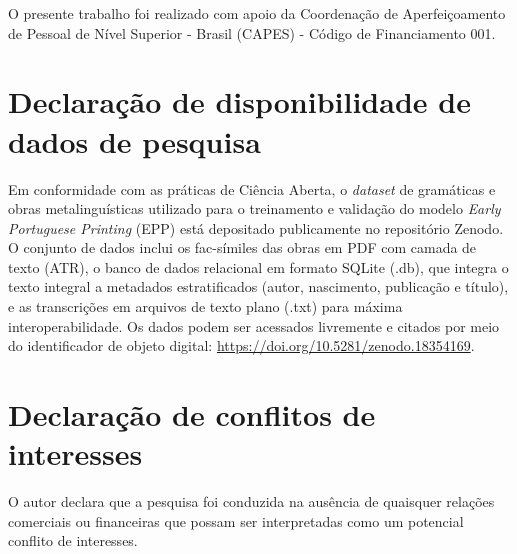 \documentclass[portuguese]{textolivre}
\begin{document}
\begin{funding}
O presente trabalho foi realizado com apoio da Coordenação de Aperfeiçoamento de Pessoal de Nível Superior - Brasil (CAPES) - Código de Financiamento 001.
\end{funding}

\section*{\fontsize{10}{12}\selectfont Declaração de disponibilidade de dados de pesquisa}
Em conformidade com as práticas de Ciência Aberta, o \textit{dataset} de gramáticas e obras metalinguísticas utilizado para o treinamento e validação do modelo \textit{Early Portuguese Printing} (EPP) está depositado publicamente no repositório Zenodo. O conjunto de dados inclui os fac-símiles das obras em PDF com camada de texto (ATR), o banco de dados relacional em formato SQLite (.db), que integra o texto integral a metadados estratificados (autor, nascimento, publicação e título), e as transcrições em arquivos de texto plano (.txt) para máxima interoperabilidade. Os dados podem ser acessados livremente e citados por meio do identificador de objeto digital: \url{https://doi.org/10.5281/zenodo.18354169}.

\section*{\fontsize{10}{12}\selectfont Declaração de conflitos de interesses}
O autor declara que a pesquisa foi conduzida na ausência de quaisquer relações comerciais ou financeiras que possam ser interpretadas como um potencial conflito de interesses.
\end{document}
